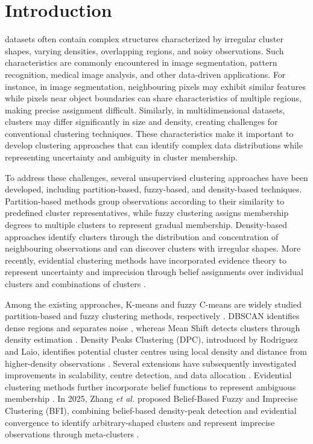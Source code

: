 \documentclass[journal]{IEEEtran}
\begin{document}
\section{Introduction}
 datasets often contain complex structures characterized by irregular cluster shapes, varying densities, overlapping regions, and noisy observations. Such characteristics are commonly encountered in image segmentation, pattern recognition, medical image analysis, and other data-driven applications. For instance, in image segmentation, neighbouring pixels may exhibit similar features while pixels near object boundaries can share characteristics of multiple regions, making precise assignment difficult. Similarly, in multidimensional datasets, clusters may differ significantly in size and density, creating challenges for conventional clustering techniques. These characteristics make it important to develop clustering approaches that can identify complex data distributions while representing uncertainty and ambiguity in cluster membership.

To address these challenges, several unsupervised clustering approaches have been developed, including partition-based, fuzzy-based, and density-based techniques. Partition-based methods group observations according to their similarity to predefined cluster representatives, while fuzzy clustering assigns membership degrees to multiple clusters to represent gradual membership. Density-based approaches identify clusters through the distribution and concentration of neighbouring observations and can discover clusters with irregular shapes. More recently, evidential clustering methods have incorporated evidence theory to represent uncertainty and imprecision through belief assignments over individual clusters and combinations of clusters \cite{zhang2025survey}.

Among the existing approaches, K-means and fuzzy C-means are widely studied partition-based and fuzzy clustering methods, respectively \cite{macqueen1967, bezdek1981}. DBSCAN identifies dense regions and separates noise \cite{ester1996}, whereas Mean Shift detects clusters through density estimation \cite{comaniciu2002}. Density Peaks Clustering (DPC), introduced by Rodriguez and Laio, identifies potential cluster centres using local density and distance from higher-density observations \cite{rodriguez2014}. Several extensions have subsequently investigated improvements in scalability, centre detection, and data allocation \cite{du2016, xie2016, guan2024, yu2026}. Evidential clustering methods further incorporate belief functions to represent ambiguous membership \cite{masson2008, su2019}. In 2025, Zhang \emph{et al.} proposed Belief-Based Fuzzy and Imprecise Clustering (BFI), combining belief-based density-peak detection and evidential convergence to identify arbitrary-shaped clusters and represent imprecise observations through meta-clusters \cite{zhang2025}.
\end{document}
